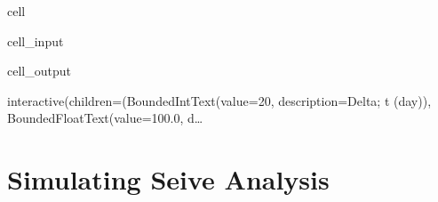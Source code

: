 \documentclass[letterpaper,10pt,english]{jupyterBook}
\begin{document}
\begin{sphinxuseclass}{cell}
\begin{sphinxVerbatimInput}
\begin{sphinxuseclass}{cell_input}
\begin{sphinxVerbatim}[commandchars=\\\{\}]
          
  \PYG{p}{[}\PYG{p}{]}  
\end{sphinxVerbatim}

\end{sphinxuseclass}\end{sphinxVerbatimInput}
\begin{sphinxVerbatimOutput}

\begin{sphinxuseclass}{cell_output}
\begin{sphinxVerbatim}[commandchars=\\\{\}]
interactive(children=(BoundedIntText(value=20, description=\PYGZsq{}\PYGZam{}Delta; t (day)\PYGZsq{}), BoundedFloatText(value=100.0, d…
\end{sphinxVerbatim}

\end{sphinxuseclass}\end{sphinxVerbatimOutput}

\end{sphinxuseclass}
\sphinxstepscope


\chapter{Simulating Seive Analysis}
\label{\detokenize{content/tools/sieve_analysis:simulating-seive-analysis}}\label{\detokenize{content/tools/sieve_analysis::doc}}
\end{document}

